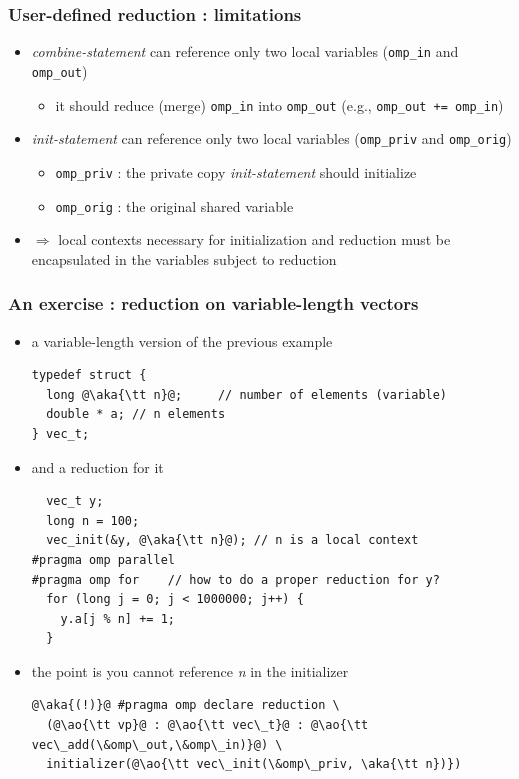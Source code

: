\documentclass[12pt,dvipdfmx]{beamer}
\newcommand{\ao}[1]{{\color{blue}#1}}
\newcommand{\aka}[1]{{\color{red}#1}}
\begin{document}
\begin{frame}[fragile]
\frametitle{User-defined reduction : limitations}
\begin{itemize}
\item {\it combine-statement} can reference
  only two local variables (\ao{\tt omp\_in} and \ao{\tt omp\_out})
  \begin{itemize}
  \item it should reduce (merge) {\tt omp\_in} into {\tt omp\_out}
    (e.g., {\tt omp\_out += omp\_in})
  \end{itemize}
\item {\it init-statement} can reference
  only two local variables (\ao{\tt omp\_priv} and \ao{\tt omp\_orig})
  \begin{itemize}
  \item {\tt omp\_priv} : the private copy {\it init-statement}
    should initialize
  \item {\tt omp\_orig} : the original shared variable
  \end{itemize}

\item $\Rightarrow$ local contexts necessary for
  initialization and reduction must be 
  encapsulated in the variables subject to reduction
\end{itemize}
\end{frame}


\begin{frame}[fragile]
\frametitle{An exercise : reduction on variable-length vectors}
\begin{itemize}
\item a variable-length version of the previous example
\begin{lstlisting}
typedef struct {
  long @\aka{\tt n}@;     // number of elements (variable)
  double * a; // n elements
} vec_t;
\end{lstlisting}

\item and a reduction for it
\begin{lstlisting}
  vec_t y;
  long n = 100;
  vec_init(&y, @\aka{\tt n}@); // n is a local context
#pragma omp parallel
#pragma omp for    // how to do a proper reduction for y?
  for (long j = 0; j < 1000000; j++) {
    y.a[j % n] += 1;
  }
\end{lstlisting}

\item the point is you cannot reference \aka{\it n} in the initializer

\begin{lstlisting}
@\aka{(!)}@ #pragma omp declare reduction \
  (@\ao{\tt vp}@ : @\ao{\tt vec\_t}@ : @\ao{\tt vec\_add(\&omp\_out,\&omp\_in)}@) \
  initializer(@\ao{\tt vec\_init(\&omp\_priv, \aka{\tt n})})
\end{lstlisting}
\end{itemize}
\end{frame}
\end{document}
